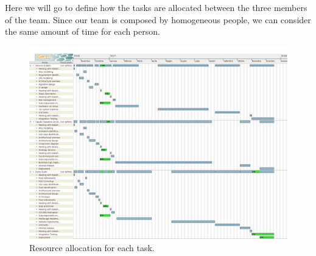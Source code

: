 Here we will go to define how the tasks are allocated between the three members of the team.
Since our team is composed by homogeneous people, we can consider the same amount of time for each person.

\begin{figure}[h]
  \centering
  \includegraphics[width=500 pt]{resources/res.png}
  \caption{\label{fig:resource} Resource allocation for each task.}
\end{figure}
